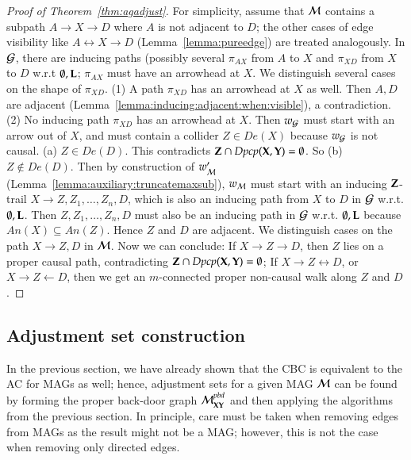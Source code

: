 \begin{proof}[Proof of Theorem~\ref{thm:agadjust}]
For simplicity, 
assume that ${\cal M}$ contains a subpath $A \to X \to D$
where $A$ is not adjacent to $D$; the other cases of
edge visibility like $A \leftrightarrow X \to D$
(Lemma~\ref{lemma:pureedge})
are treated analogously. In ${\cal G}$, there are inducing
paths (possibly several  %
$\pi_{AX}$ from $A$ to $X$ and $\pi_{XD}$ from $X$ to $D$
w.r.t $\emptyset,{\bf L}$; $\pi_{AX}$ must have an arrowhead at $X$.
We distinguish several cases on the shape of $\pi_{XD}$.
(1) A path $\pi_{XD}$ has an arrowhead at $X$ as well.
Then $A,D$ are adjacent (Lemma~\ref{lemma:inducing:adjacent:when:visible}),
a contradiction.
(2) No inducing path $\pi_{XD}$ has an arrowhead at $X$. 
Then $w_{\cal G}$ must start with an arrow out of $X$,
and must contain a collider $Z \in \textit{De}(X)$ because
$w_{\cal G}$ is not causal. 
(a) $Z \in \textit{De}(D)$. This contradicts
${\bf Z}\cap\textit{Dpcp}({\bf X},{\bf Y})=\emptyset$. So 
(b) $Z \notin \textit{De}(D)$. Then by construction of $w_{\cal M}'$
(Lemma~\ref{lemma:auxiliary:truncatemaxsub}), 
$w_{\cal M}$ must start with an inducing ${\bf Z}$-trail 
$X \to Z,Z_1,\ldots,Z_n,D$, which is also an inducing path
from $X$ to $D$ in ${\cal G}$ w.r.t. $\emptyset,{\bf L}$.
Then $Z,Z_1,\ldots,Z_n,D$ must also be an inducing path
in ${\cal G}$ w.r.t. $\emptyset,{\bf L}$ because 
$\textit{An}(X)\subseteq\textit{An}(Z)$. Hence $Z$ and $D$
are adjacent. We distinguish cases on the path 
$X \to Z,D$ in ${\cal M}$. Now we can conclude:  If $X\to Z \to D$,
then $Z$ lies on a proper causal path, contradicting
${\bf Z}\cap\textit{Dpcp}({\bf X},{\bf Y})=\emptyset$; If $X\to Z \leftrightarrow D$,
or $X\to Z \gets D$,
then we get an $m$-connected proper 
non-causal walk along $Z$ and $D$.
\end{proof}



\subsection{Adjustment set construction}

In the previous section, we have already shown 
that the CBC is equivalent to the AC
for MAGs as well; hence, adjustment sets for a 
given MAG ${\cal M}$ can be found by forming the proper
back-door graph ${\cal M}^{pbd}_{{\bf X}{\bf Y}}$ and then applying the algorithms
from the previous section. In principle, care must
be taken when removing edges from MAGs as the result
might not be a MAG; however, this is not the case
when removing only directed edges.

